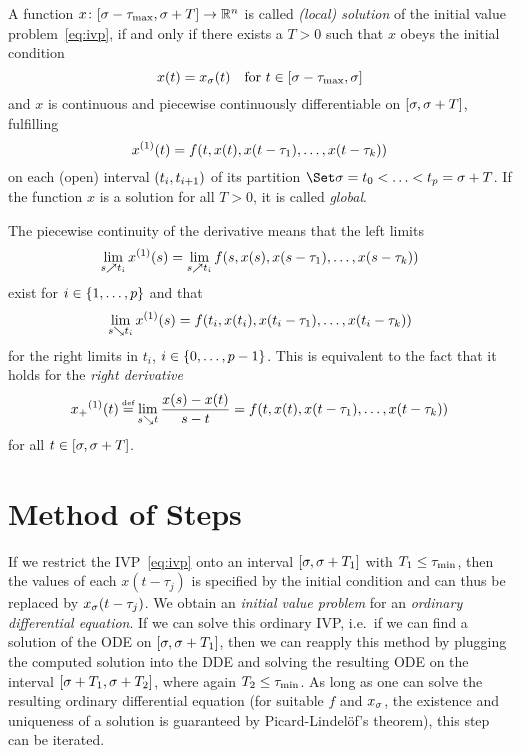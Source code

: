     \begin{definition}\label{def:solution-dde}
        A function $x\colon[\sigma-\tau_{\max},\sigma+T]\to\mathbb{R}^n$ is called \emph{(local) solution} of the initial value problem~\eqref{eq:ivp}, if and only if there exists a $T>0$ such that
        $x$ obeys the initial condition
        \begin{equation*}
            x(t) = x_{\sigma}(t) \quad\text{for } t\in[\sigma-\tau_{\max},\sigma]
        \end{equation*}
        and $x$ is continuous and piecewise continuously differentiable on $[\sigma,\sigma+T]$, fulfilling
        \begin{equation*}
            \D{x}(t) = f(t,x(t),x(t-\tau_1),\ldots,x(t-\tau_k))
        \end{equation*}
        on each (open) interval $(t_i,t_{i+1})$ of its partition $\partition{\tzero=t_0}{t_p=\tzero+T}$.
        If the function $x$ is a solution for all $T>0$, it is called \emph{global}.
    \end{definition}

    The piecewise continuity of the derivative means that the left limits
    \begin{equation*}
        \lim_{s\upto t_i}\D{x}(s) = \lim_{s\upto t_i}f(s,x(s),x(s-\tau_1),\ldots,x(s-\tau_k))
    \end{equation*}
    exist for $i\in\left\{1,\ldots,p\right\}$ and that
    \begin{equation*}
        \lim_{s\downto t_i}\D{x}(s) = f(t_i,x(t_i),x(t_i-\tau_1),\ldots,x(t_i-\tau_k))
    \end{equation*}
    for the right limits in $t_i$, $i\in\left\{0,\ldots,p-1\right\}$.
    This is equivalent to the fact that it holds for the \emph{right derivative}
    \begin{equation*}
        \D{x_+}(t)\defeq
        \lim_{s\downto t}\frac{x(s)-x(t)}{s-t}
        = f(t,x(t),x(t-\tau_1),\ldots,x(t-\tau_k))
    \end{equation*}
    for all $t\in[\sigma,\sigma+T]$.


\section{Method of Steps}
    \label{sec:method-of-steps}

    If we restrict the IVP~\eqref{eq:ivp} onto an interval $[\sigma,\sigma+T_1]$ with $T_1\leq\tau_{\min}$, then the values of each $x(t-\tau_j)$ is specified by the initial condition and can thus be replaced by $x_{\sigma}(t-\tau_j)$.
    We obtain an \emph{initial value problem} for an \emph{ordinary differential equation}.
    If we can solve this ordinary IVP, i.e.\ if we can find a solution of the ODE on $[\sigma,\sigma+T_1]$, then we can reapply this method by plugging the computed solution into the DDE and solving the resulting ODE on the interval $[\sigma+T_1,\sigma+T_2]$, where again $T_2\leq\tau_{\min}$. As long as one can solve the resulting ordinary differential equation (for suitable $f$ and $x_{\sigma}$, the existence and uniqueness of a solution is guaranteed by Picard-Lindelöf's theorem), this step can be iterated.

